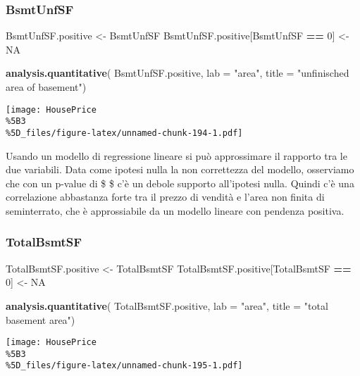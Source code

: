 \documentclass[
]{article}
\newenvironment{Shaded}{\begin{snugshade}}{\end{snugshade}}
\newcommand{\AttributeTok}[1]{\textcolor[rgb]{0.13,0.29,0.53}{#1}}
\newcommand{\ConstantTok}[1]{\textcolor[rgb]{0.56,0.35,0.01}{#1}}
\newcommand{\DecValTok}[1]{\textcolor[rgb]{0.00,0.00,0.81}{#1}}
\newcommand{\FunctionTok}[1]{\textcolor[rgb]{0.13,0.29,0.53}{\textbf{#1}}}
\newcommand{\NormalTok}[1]{#1}
\newcommand{\OtherTok}[1]{\textcolor[rgb]{0.56,0.35,0.01}{#1}}
\newcommand{\SpecialCharTok}[1]{\textcolor[rgb]{0.81,0.36,0.00}{\textbf{#1}}}
\newcommand{\StringTok}[1]{\textcolor[rgb]{0.31,0.60,0.02}{#1}}
\begin{document}
\subsubsection{BsmtUnfSF}\label{bsmtunfsf-1}

\begin{Shaded}
\begin{Highlighting}[]
\NormalTok{BsmtUnfSF.positive }\OtherTok{\textless{}{-}}\NormalTok{ BsmtUnfSF}
\NormalTok{BsmtUnfSF.positive[BsmtUnfSF }\SpecialCharTok{==} \DecValTok{0}\NormalTok{] }\OtherTok{\textless{}{-}} \ConstantTok{NA}

\FunctionTok{analysis.quantitative}\NormalTok{(}
\NormalTok{    BsmtUnfSF.positive,}
    \AttributeTok{lab =} \StringTok{"area"}\NormalTok{,}
    \AttributeTok{title =} \StringTok{"unfinisched area of basement"}\NormalTok{)}
\end{Highlighting}
\end{Shaded}

\texttt{[image: HousePrice\\\%5B3\\\%5D\_files/figure-latex/unnamed-chunk-194-1.pdf]}

Usando un modello di regressione lineare si può approssimare il rapporto
tra le due variabili. Data come ipotesi nulla la non correttezza del
modello, osserviamo che con un p-value di \$  \$ c'è un
debole supporto all'ipotesi nulla. Quindi c'è una correlazione
abbastanza forte tra il prezzo di vendità e l'area non finita di
seminterrato, che è approssiabile da un modello lineare con pendenza
positiva.

\subsubsection{TotalBsmtSF}\label{totalbsmtsf-1}

\begin{Shaded}
\begin{Highlighting}[]
\NormalTok{TotalBsmtSF.positive }\OtherTok{\textless{}{-}}\NormalTok{ TotalBsmtSF}
\NormalTok{TotalBsmtSF.positive[TotalBsmtSF }\SpecialCharTok{==} \DecValTok{0}\NormalTok{] }\OtherTok{\textless{}{-}} \ConstantTok{NA}

\FunctionTok{analysis.quantitative}\NormalTok{(}
\NormalTok{    TotalBsmtSF.positive,}
    \AttributeTok{lab =} \StringTok{"area"}\NormalTok{,}
    \AttributeTok{title =} \StringTok{"total basement area"}\NormalTok{)}
\end{Highlighting}
\end{Shaded}

\texttt{[image: HousePrice\\\%5B3\\\%5D\_files/figure-latex/unnamed-chunk-195-1.pdf]}
\end{document}
